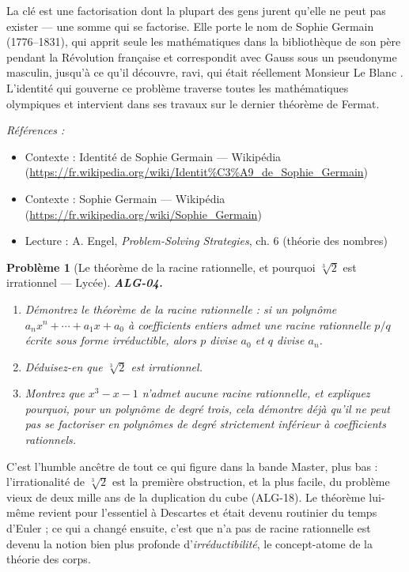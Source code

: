 \documentclass[11pt]{article}
\newtheorem{problem}{Problème}
\newenvironment{refs}{\par\small\noindent\emph{Références :}\begin{itemize}\setlength\itemsep{0pt}}{\end{itemize}\normalsize}
\begin{document}
\noindent La clé est une factorisation dont la plupart des gens jurent qu'elle ne peut pas exister --- une somme
qui se factorise. Elle porte le nom de Sophie Germain (1776--1831), qui apprit seule les mathématiques
dans la bibliothèque de son père pendant la Révolution française et correspondit avec Gauss sous un
pseudonyme masculin, jusqu'à ce qu'il découvre, ravi, qui était réellement \og{} Monsieur Le Blanc \fg{}. L'identité
qui gouverne ce problème traverse toutes les mathématiques olympiques et intervient dans ses travaux sur le
dernier théorème de Fermat.

\begin{refs}
\item Contexte : Identité de Sophie Germain --- Wikipédia (\url{https://fr.wikipedia.org/wiki/Identit%C3%A9_de_Sophie_Germain})
\item Contexte : Sophie Germain --- Wikipédia (\url{https://fr.wikipedia.org/wiki/Sophie_Germain})
\item Lecture : A. Engel, \textit{Problem-Solving Strategies}, ch. 6 (théorie des nombres)
\end{refs}

\bigskip

\begin{problem}[{Le théorème de la racine rationnelle, et pourquoi $\sqrt[3]{2}$ est irrationnel --- Lycée}]
\textbf{ALG-04.} \begin{enumerate}
\item[(i)] Démontrez le théorème de la racine rationnelle : si un polynôme
$a_n x^n + \cdots + a_1 x + a_0$ à coefficients entiers admet une racine rationnelle $p/q$ écrite sous
forme irréductible, alors $p$ divise $a_0$ et $q$ divise $a_n$.
\item[(ii)] Déduisez-en que
$\sqrt[3]{2}$ est irrationnel.
\item[(iii)] Montrez que $x^3 - x - 1$ n'admet aucune racine rationnelle, et
expliquez pourquoi, pour un polynôme de degré trois, cela démontre déjà qu'il ne peut pas se factoriser en
polynômes de degré strictement inférieur à coefficients rationnels.
\end{enumerate}

\end{problem}

\noindent C'est l'humble ancêtre de tout ce qui figure dans la bande Master, plus bas : l'irrationalité
de $\sqrt[3]{2}$ est la première obstruction, et la plus facile, du problème vieux de deux mille ans de la
duplication du cube (ALG-18). Le théorème lui-même revient pour l'essentiel à Descartes et était devenu
routinier du temps d'Euler ; ce qui a changé ensuite, c'est que \og{} n'a pas de racine rationnelle \fg{} est devenu la
notion bien plus profonde d'\textit{irréductibilité}, le concept-atome de la théorie des corps.
\end{document}
